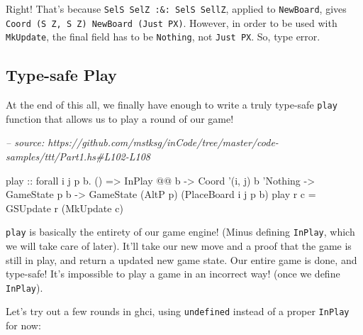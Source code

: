 \documentclass[]{article}
\newenvironment{Shaded}{}{}
\newcommand{\CommentTok}[1]{\textcolor[rgb]{0.38,0.63,0.69}{\textit{#1}}}
\newcommand{\DataTypeTok}[1]{\textcolor[rgb]{0.56,0.13,0.00}{#1}}
\newcommand{\FunctionTok}[1]{\textcolor[rgb]{0.02,0.16,0.49}{#1}}
\newcommand{\NormalTok}[1]{#1}
\newcommand{\OtherTok}[1]{\textcolor[rgb]{0.00,0.44,0.13}{#1}}
\begin{document}
Right! That's because \texttt{SelS\ SelZ\ :\&:\ SelS\ SellZ}, applied to
\texttt{NewBoard}, gives
\texttt{Coord\ \textquotesingle{}(\textquotesingle{}S\ \textquotesingle{}Z,\ \textquotesingle{}S\ \textquotesingle{}Z)\ NewBoard\ (\textquotesingle{}Just\ \textquotesingle{}PX)}.
However, in order to be used with \texttt{MkUpdate}, the final field has to be
\texttt{\textquotesingle{}Nothing}, not
\texttt{\textquotesingle{}Just\ \textquotesingle{}PX}. So, type error.

\hypertarget{type-safe-play}{%
\subsection{Type-safe Play}\label{type-safe-play}}

At the end of this all, we finally have enough to write a truly type-safe
\texttt{play} function that allows us to play a round of our game!

\begin{Shaded}
\begin{Highlighting}[]
\CommentTok{-- source: https://github.com/mstksg/inCode/tree/master/code-samples/ttt/Part1.hs#L102-L108}

\NormalTok{play}
\OtherTok{    ::}\NormalTok{ forall i j p b}\FunctionTok{.}\NormalTok{ ()}
    \OtherTok{=>} \DataTypeTok{InPlay} \FunctionTok{@@}\NormalTok{ b}
    \OtherTok{->} \DataTypeTok{Coord}\NormalTok{ '(i, j) b '}\DataTypeTok{Nothing}
    \OtherTok{->} \DataTypeTok{GameState}\NormalTok{ p b}
    \OtherTok{->} \DataTypeTok{GameState}\NormalTok{ (}\DataTypeTok{AltP}\NormalTok{ p) (}\DataTypeTok{PlaceBoard}\NormalTok{ i j p b)}
\NormalTok{play r c }\FunctionTok{=} \DataTypeTok{GSUpdate}\NormalTok{ r (}\DataTypeTok{MkUpdate}\NormalTok{ c)}
\end{Highlighting}
\end{Shaded}

\texttt{play} is basically the entirety of our game engine! (Minus defining
\texttt{InPlay}, which we will take care of later). It'll take our new move and
a proof that the game is still in play, and return a updated new game state. Our
entire game is done, and type-safe! It's impossible to play a game in an
incorrect way! (once we define \texttt{InPlay}).

Let's try out a few rounds in ghci, using \texttt{undefined} instead of a proper
\texttt{InPlay} for now:
\end{document}
